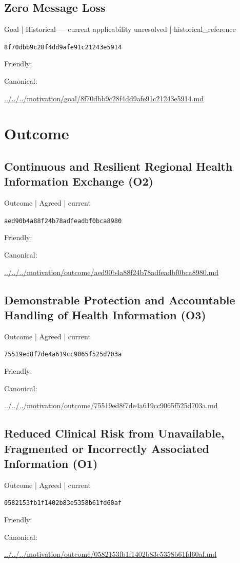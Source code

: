 \documentclass[10pt,a4paper]{article}
\begin{document}
\subsection*{Zero Message Loss}
{\small Goal | Historical — current applicability unresolved | historical\_reference}\par
\texttt{8f70dbb9c28f4dd9afe91c21243e5914}\par
Friendly: \par
Canonical: \par
{\footnotesize\url{../../../motivation/goal/8f70dbb9c28f4dd9afe91c21243e5914.md}}\par
\section*{Outcome}
\subsection*{Continuous and Resilient Regional Health Information Exchange (O2)}
{\small Outcome | Agreed | current}\par
\texttt{aed90b4a88f24b78adfeadbf0bca8980}\par
Friendly: \par
Canonical: \par
{\footnotesize\url{../../../motivation/outcome/aed90b4a88f24b78adfeadbf0bca8980.md}}\par
\subsection*{Demonstrable Protection and Accountable Handling of Health Information (O3)}
{\small Outcome | Agreed | current}\par
\texttt{75519ed8f7de4a619cc9065f525d703a}\par
Friendly: \par
Canonical: \par
{\footnotesize\url{../../../motivation/outcome/75519ed8f7de4a619cc9065f525d703a.md}}\par
\subsection*{Reduced Clinical Risk from Unavailable, Fragmented or Incorrectly Associated Information (O1)}
{\small Outcome | Agreed | current}\par
\texttt{0582153fb1f1402b83e5358b61fd60af}\par
Friendly: \par
Canonical: \par
{\footnotesize\url{../../../motivation/outcome/0582153fb1f1402b83e5358b61fd60af.md}}\par
\end{document}
